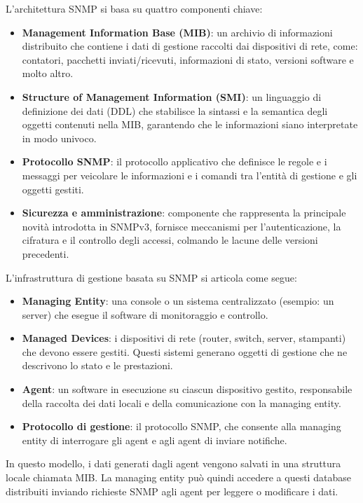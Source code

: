 L'architettura SNMP si basa su quattro componenti chiave:

\begin{itemize}
\item \textbf{Management Information Base (MIB)}: un archivio di informazioni
distribuito che contiene i dati di gestione raccolti dai dispositivi di rete,
come: contatori, pacchetti inviati/ricevuti, informazioni di stato, 
versioni software e molto altro.
\item \textbf{Structure of Management Information (SMI)}: un linguaggio di
definizione dei dati (DDL) che stabilisce la sintassi e la semantica degli
oggetti contenuti nella MIB, garantendo che le informazioni siano interpretate
in modo univoco.
\item \textbf{Protocollo SNMP}: il protocollo applicativo che definisce le
regole e i messaggi per veicolare le informazioni e i comandi tra l'entità di
gestione e gli oggetti gestiti.
\item \textbf{Sicurezza e amministrazione}: componente che rappresenta la
principale novità introdotta in SNMPv3, fornisce meccanismi per
l'autenticazione, la cifratura e il controllo degli accessi, colmando le lacune
delle versioni precedenti.
\end{itemize}

L'infrastruttura di gestione basata su SNMP si articola come segue:

\begin{itemize}
\item \textbf{Managing Entity}: una console o un sistema centralizzato
(esempio: un server) che esegue il software di monitoraggio e controllo.
\item \textbf{Managed Devices}: i dispositivi di rete (router, switch, server,
stampanti) che devono essere gestiti. Questi sistemi generano oggetti di
gestione che ne descrivono lo stato e le prestazioni.
\item \textbf{Agent}: un software in esecuzione su ciascun dispositivo gestito,
responsabile della raccolta dei dati locali e della comunicazione con la
managing entity.
\item \textbf{Protocollo di gestione}: il protocollo SNMP, che consente alla
managing entity di interrogare gli agent e agli agent di inviare notifiche.
\end{itemize}

In questo modello, i dati generati dagli agent vengono salvati in una struttura
locale chiamata MIB. La managing entity può quindi accedere a questi database
distribuiti inviando richieste SNMP agli agent per leggere o modificare i dati.

